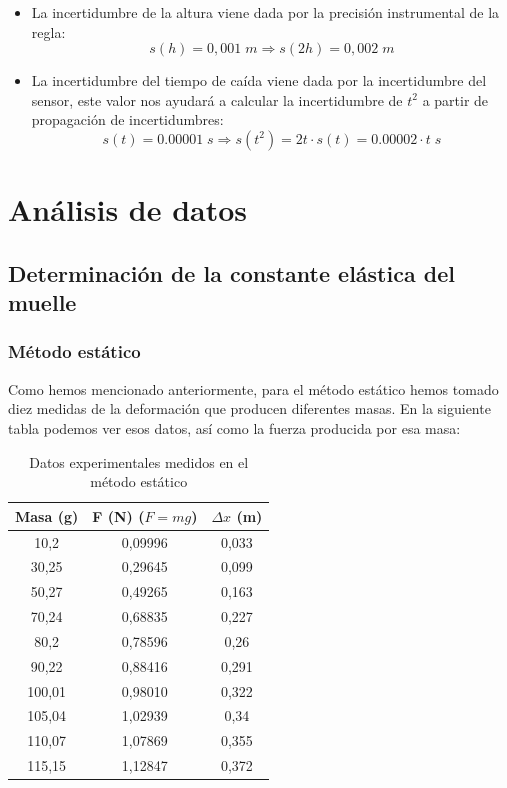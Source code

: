\documentclass[a4paper,12pt,titlepage]{article}
\begin{document}
\begin{itemize}
    \item La incertidumbre de la altura viene dada por la precisión instrumental de la regla:
    \begin{equation}
        s(h) = 0,001\; m \Rightarrow s(2h) = 0,002 \; m
    \end{equation}
    \item La incertidumbre del tiempo de caída viene dada por la incertidumbre del sensor, este valor nos ayudará a calcular la incertidumbre de $t^2$ a partir de propagación de incertidumbres:
    \begin{equation}
        s(t) = 0.00001 \; s \Rightarrow s(t^2)= 2t \cdot s(t) = 0.00002 \cdot t \; s
        \label{Inc Tcuadrado}
    \end{equation}
\end{itemize}

\newpage

\section{Análisis de datos}

\subsection{Determinación de la constante elástica del muelle}

\subsubsection{Método estático}

Como hemos mencionado anteriormente, para el método estático hemos tomado diez medidas de la deformación que producen diferentes masas. En la siguiente tabla podemos ver esos datos, así como la fuerza producida por esa masa:

\begin{table}[h!]
    \centering
    \begin{tabular}{|c|c|c|}
    \hline
    Masa (g) & F (N) ($F=mg$) & $\Delta x$ (m) \\ \hline
    10,2   & 0,09996 & 0,033 \\ \hline
    30,25  & 0,29645 & 0,099 \\ \hline
    50,27  & 0,49265 & 0,163 \\ \hline
    70,24  & 0,68835 & 0,227 \\ \hline
    80,2   & 0,78596 & 0,26  \\ \hline
    90,22  & 0,88416 & 0,291 \\ \hline
    100,01 & 0,98010 & 0,322 \\ \hline
    105,04 & 1,02939 & 0,34  \\ \hline
    110,07 & 1,07869 & 0,355 \\ \hline
    115,15 & 1,12847 & 0,372 \\ \hline
    \end{tabular}
    \caption{Datos experimentales medidos en el método estático}
    \label{Datos estatico}
\end{table}
\end{document}
